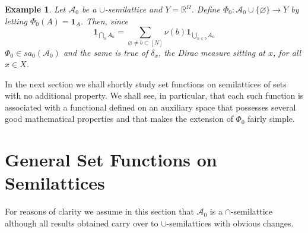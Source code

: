 \documentclass[11pt]{amsart}
\theoremstyle{plain}
\newtheorem{example}{Example}
\begin{document}
\begin{example}
\label{ex dirac}
Let ${\mathscr{A}}_0$ be a $\cup$-semilattice and $Y={\mathbb{R}}^\Omega$. Define 
$\Phi_0:{\mathscr{A}}_0\cup\{{\varnothing}\}\to Y$ by letting $\Phi_0(A)={\mathbf{1}_{{A}}}$. Then, 
since
\begin{equation}
\label{lattice representation}
{\mathbf{1}_{{\bigcap_nA_n}}}=\sum_{{\varnothing}\ne b\subset[N]}\nu(b){\mathbf{1}_{{\bigcup_{n\in b}A_n}}}
\end{equation}
$\Phi_0\in sa_0({\mathscr{A}}_0)$ and the same is true of $\delta_x$, the Dirac 
measure sitting at $x$, for all $x\in X$. 
\end{example}

In the next section we shall shortly study set functions on semilattices of sets
with no additional property. We shall see, in particular, that each such function is 
associated with a functional defined on an auxiliary space that possesses several
good mathematical properties and that makes the extension of $\Phi_0$ fairly
simple.

\section{General Set Functions on Semilattices}
\label{sec general}

For reasons of clarity we assume in this section that ${\mathscr{A}}_0$ is a $\cap$-semilattice 
although all results obtained carry over to $\cup$-semilattices with obvious changes. 
\end{document}
